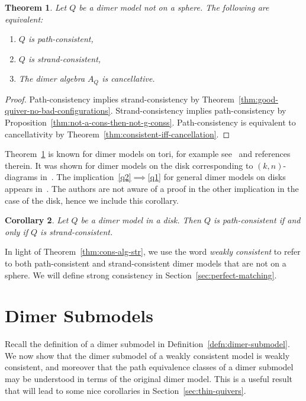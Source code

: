 \documentclass{article}
\newtheorem{thm}{Theorem}[section]
\newtheorem{cor}[thm]{Corollary}
\theoremstyle{definition}
\begin{document}
\begin{thm}\label{thm:not-a-cons-then-not-g-cons}\label{thm:cons-alg-str}
	Let $Q$ be a dimer model not on a sphere. The following are equivalent:
	\begin{enumerate}
		\item $Q$ is path-consistent,
		\item $Q$ is strand-consistent,
		\item The dimer algebra $A_Q$ is cancellative.
	\end{enumerate}
\end{thm}
\begin{proof}
	Path-consistency implies strand-consistency by Theorem~\ref{thm:good-quiver-no-bad-configurations}. Strand-consistency implies path-consistency by Proposition~\ref{thm:not-a-cons-then-not-g-conss}.
	Path-consistency is equivalent to cancellativity by Theorem~\ref{thm:consistent-iff-cancellation}.
\end{proof}
Theorem~\ref{thm:not-a-cons-then-not-g-cons} is known for dimer models on tori, for example see~\cite{XBocklandt2011} and references therein.
It was shown for dimer models on the disk corresponding to $(k,n)$-diagrams in~\cite{BKMX}. The implication~\eqref{q2}$\implies$\eqref{q1} for general dimer models on disks appears in~\cite[Proposition 2.11]{XPressland2019}. The authors are not aware of a proof in the other implication in the case of the disk, hence we include this corollary. 
\begin{cor}\label{cor:main-cor-disk}
	Let $Q$ be a dimer model in a disk. Then $Q$ is path-consistent if and only if $Q$ is strand-consistent.
\end{cor}

In light of Theorem~\ref{thm:cons-alg-str}, we use the word \textit{weakly consistent} to refer to both path-consistent and strand-consistent dimer models that are not on a sphere. 
We will define strong consistency in Section~\ref{sec:perfect-matching}.

\section{Dimer Submodels}\label{sec:ds}

Recall the definition of a {dimer submodel} in Definition~\ref{defn:dimer-submodel}. We now show that the dimer submodel of a weakly consistent model is weakly consistent, and moreover that the path equivalence classes of a dimer submodel may be understood in terms of the original dimer model. This is a useful result that will lead to some nice corollaries in Section~\ref{sec:thin-quivers}.
\end{document}
